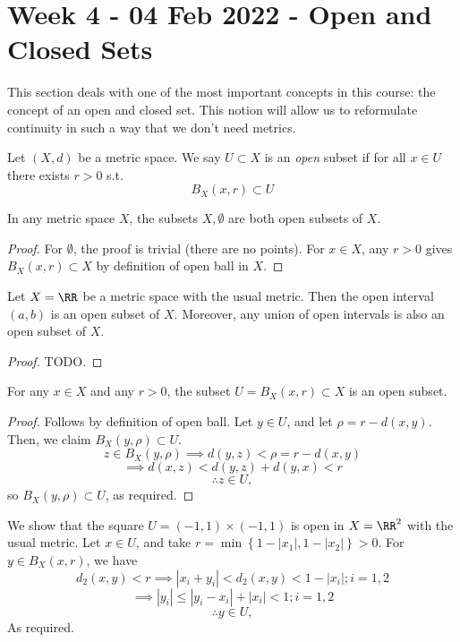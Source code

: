 \section{Week 4 - 04 Feb 2022 - Open and Closed Sets}
This section deals with one of the most important concepts in this course: the
concept of an open and closed set. This notion will allow us to reformulate
continuity in such a way that we don't need metrics.
\begin{definition}
  Let $(X,d)$ be a metric space. We say $U\subset X$ is an \emph{open} subset if
  for all $x\in U$ there exists $r>0$ s.t.
  \[B_{X}(x,r)\subset U\]
  \label{<+label+>}
\end{definition}

\begin{proposition}
  In any metric space $X$, the subsets $X, \emptyset$ are both open subsets of
  $X$.
  \label{<+label+>}
\end{proposition}
\begin{proof}
  For $\emptyset$, the proof is trivial (there are no points). For $x\in X$, any
  $r>0$ gives $B_X(x,r)\subset X$ by definition of open ball in $X$.
\end{proof}

\begin{proposition}
  Let $X=\RR$ be a metric space with the usual metric. Then the open interval
  $(a,b)$ is an open subset of $X$. Moreover, any union of open intervals is
  also an open subset of $X$.
  \label{<+label+>}
\end{proposition}
\begin{proof}
  TODO.
\end{proof}

\begin{proposition}
  For any $x\in X$ and any $r>0$, the subset $U=B_X(x,r)\subset X$ is an open
  subset.
\end{proposition}
\begin{proof}
  Follows by definition of open ball. Let $y\in U$, and let $\rho = r-d(x,y)$.
  Then, we claim $B_X(y,\rho)\subset U$.
  \[z\in B_X(y,\rho) \implies d(y,z) < \rho = r-d(x,y)\]
  \[\implies d(x,z) < d(y,z)+d(y,x) < r\]
  \[\therefore z\in U,\]
  so $B_X(y,\rho)\subset U $, as required.
\end{proof}

\begin{example}
  We show that the square $U=(-1,1)\times(-1,1)$ is open in $X=\RR^2$ with the
  usual metric. Let $x\in U$, and take $r=\min\left\{ 1-|x_1|,1-|x_2|
  \right\}>0$. For $y\in B_X(x,r)$, we have 
  \[d_2(x,y) <r \implies |x_i+y_i|< d_2(x,y)<1-|x_i| ; i=1,2\]
  \[\implies |y_i|\leq |y_i-x_i| + |x_i|<1 ; i=1,2\]
  \[\therefore y\in U,\]
  As required.
\end{example}

